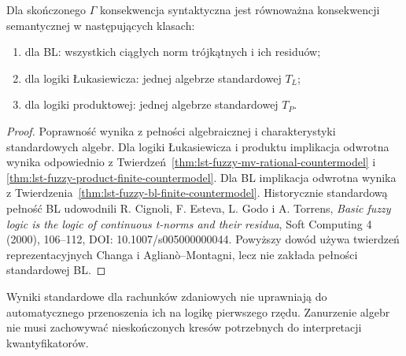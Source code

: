\begin{twierdzenie}
\label{thm:lst-fuzzy-finite-standard}
Dla skończonego $\Gamma$ konsekwencja syntaktyczna jest
równoważna konsekwencji semantycznej w następujących klasach:
\begin{enumerate}
\item dla BL: wszystkich ciągłych norm trójkątnych i ich residuów;
\item dla logiki Łukasiewicza: jednej algebrze standardowej $T_L$;
\item dla logiki produktowej: jednej algebrze standardowej $T_P$.
\end{enumerate}
\end{twierdzenie}
\begin{proof}
Poprawność wynika z pełności algebraicznej i charakterystyki
standardowych algebr. Dla logiki Łukasiewicza i produktu
implikacja odwrotna wynika odpowiednio z
Twierdzeń~\ref{thm:lst-fuzzy-mv-rational-countermodel}
i \ref{thm:lst-fuzzy-product-finite-countermodel}.
Dla BL implikacja odwrotna wynika z
Twierdzenia~\ref{thm:lst-fuzzy-bl-finite-countermodel}.
Historycznie standardową pełność BL udowodnili
R. Cignoli, F. Esteva, L. Godo i A. Torrens,
\emph{Basic fuzzy logic is the logic of continuous
t-norms and their residua}, Soft Computing 4 (2000),
106--112, DOI: 10.1007/s005000000044.
Powyższy dowód używa twierdzeń reprezentacyjnych
Changa i Aglianò--Montagni, lecz nie zakłada pełności
standardowej BL.
\end{proof}

\begin{uwaga}\label{rem:ncl-standard-predicate-transfer}
Wyniki standardowe dla rachunków zdaniowych nie uprawniają
do automatycznego przenoszenia ich na logikę pierwszego rzędu.
Zanurzenie algebr nie musi zachowywać nieskończonych kresów
potrzebnych do interpretacji kwantyfikatorów.
\end{uwaga}

